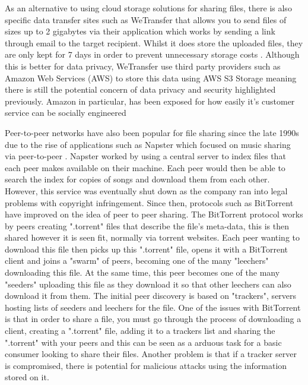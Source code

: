 \documentclass[]{report}
\begin{document}
	As an alternative to using cloud storage solutions for sharing files, there is also specific data transfer sites such as WeTransfer that allows you to send files of sizes up to 2 gigabytes via their application which works by sending a link through email to the target recipient. Whilst it does store the uploaded files, they are only kept for 7 days in order to prevent unnecessary storage costs \cite{WeTransfer Storage Time}. Although this is better for data privacy, WeTransfer use third party providers such as Amazon Web Services (AWS) to store this data using AWS S3 Storage \cite{WeTransfer AWS Case Study} meaning there is still the potential concern of data privacy and security highlighted previously. Amazon in particular, has been exposed for how easily it's customer service can be socially engineered \cite{Amazon Social Engineering}
	
	Peer-to-peer networks have also been popular for file sharing since the late 1990s due to the rise of applications such as Napster which focused on music sharing via peer-to-peer . Napster worked by using a central server to index files that each peer makes available on their machine. Each peer would then be able to search the index for copies of songs and download them from each other. However, this service was eventually shut down as the company ran into legal problems with copyright infringement. Since then, protocols such as BitTorrent have improved on the idea of peer to peer sharing. The BitTorrent protocol works by peers creating ".torrent" files that describe the file's meta-data, this is then shared however it is seen fit, normally via torrent websites. Each peer wanting to download this file then picks up this ".torrent" file, opens it with a BitTorrent client and joins a "swarm" of peers, becoming one of the many "leechers" downloading this file. At the same time, this peer becomes one of the many "seeders" uploading this file as they download it so that other leechers can also download it from them. The initial peer discovery is based on "trackers", servers hosting lists of seeders and leechers for the file. One of the issues with BitTorrent is that in order to share a file, you must go through the process of downloading a client, creating a ".torrent" file, adding it to a trackers list and sharing the ".torrent" with your peers and this can be seen as a arduous task for a basic consumer looking to share their files. Another problem is that if a tracker server is compromised, there is potential for malicious attacks using the information stored on it.
	
\end{document}
